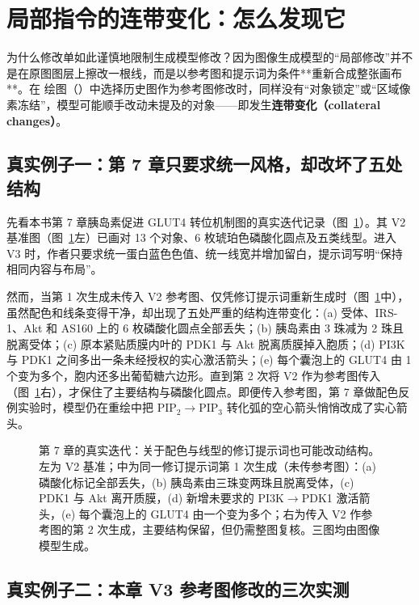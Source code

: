 \section{局部指令的连带变化：怎么发现它}

为什么修改单如此谨慎地限制生成模型修改？因为图像生成模型的“局部修改”并不是在原图图层上擦改一根线，而是以参考图和提示词为条件**重新合成整张画布**。在 \scidraw{} 绘图（）中选择历史图作为参考图修改时，同样没有“对象锁定”或“区域像素冻结”，模型可能顺手改动未提及的对象——即发生\textbf{连带变化（collateral changes）}。

\subsection{真实例子一：第 7 章只要求统一风格，却改坏了五处结构}

先看本书第 7 章胰岛素促进 GLUT4 转位机制图的真实迭代记录（图~\ref{fig:ch11-07}）。其 V2 基准图（图~\ref{fig:ch11-07}左）已画对 13 个对象、6 枚琥珀色磷酸化圆点及五类线型。进入 V3 时，作者只要求统一蛋白蓝色色值、统一线宽并增加留白，提示词写明“保持相同内容与布局”。

然而，当第 1 次生成未传入 V2 参考图、仅凭修订提示词重新生成时（图~\ref{fig:ch11-07}中），虽然配色和线条变得干净，却出现了五处严重的结构连带变化：(a) 受体、IRS-1、Akt 和 AS160 上的 6 枚磷酸化圆点全部丢失；(b) 胰岛素由 3 珠减为 2 珠且脱离受体；(c) 原本紧贴质膜内叶的 PDK1 与 Akt 脱离质膜掉入胞质；(d) PI3K 与 PDK1 之间多出一条未经授权的实心激活箭头；(e) 每个囊泡上的 GLUT4 由 1 个变为多个，胞内还多出葡萄糖六边形。直到第 2 次将 V2 作为参考图传入（图~\ref{fig:ch11-07}右），才保住了主要结构与磷酸化圆点。即便传入参考图，第 7 章做配色反例实验时，模型仍在重绘中把 $\text{PIP}_2 \rightarrow \text{PIP}_3$ 转化弧的空心箭头悄悄改成了实心箭头。

\begin{figure}[htbp]\centering

\caption{第 7 章的真实迭代：关于配色与线型的修订提示词也可能改动结构。左为 V2 基准；中为同一修订提示词第 1 次生成（未传参考图）：(a) 磷酸化标记全部丢失，(b) 胰岛素由三珠变两珠且脱离受体，(c) PDK1 与 Akt 离开质膜，(d) 新增未要求的 PI3K$\rightarrow$PDK1 激活箭头，(e) 每个囊泡上的 GLUT4 由一个变为多个；右为传入 V2 作参考图的第 2 次生成，主要结构保留，但仍需整图复核。三图均由图像模型生成。}\label{fig:ch11-07}
\end{figure}

\subsection{真实例子二：本章 V3 参考图修改的三次实测}

